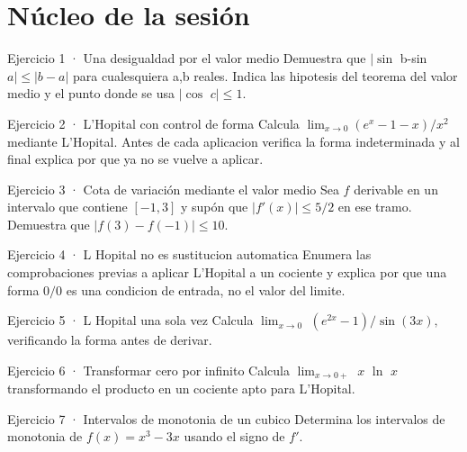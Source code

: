 \documentclass[10pt,a4paper,oneside,openany]{book}
\begin{document}
\section*{Núcleo de la sesión}
\begin{PSevenExerciseFixed}{Ejercicio 1 · Una desigualdad por el valor medio}
Demuestra que \(|\sin\) b-sin \(a|\le |b-a|\) para cualesquiera a,b reales. Indica las hipotesis del teorema del valor medio y el punto donde se usa \(|\cos\) \(c|\le 1\).
\end{PSevenExerciseFixed}
\begin{PSevenExerciseFixed}{Ejercicio 2 · L'Hopital con control de forma}
Calcula \(\lim_{x\to 0}(e^x-1-x)/x^{2}\) mediante L'Hopital. Antes de cada aplicacion verifica la forma indeterminada y al final explica por que ya no se vuelve a aplicar.
\end{PSevenExerciseFixed}
\begin{PSevenExerciseFixed}{Ejercicio 3 · Cota de variación mediante el valor medio}
Sea \(f\) derivable en un intervalo que contiene \([-1,3]\) y supón que \(|f'(x)|\le5/2\) en ese tramo. Demuestra que \(|f(3)-f(-1)|\le10\).
\end{PSevenExerciseFixed}
\begin{PSevenExerciseFixed}{Ejercicio 4 · L Hopital no es sustitucion automatica}
Enumera las comprobaciones previas a aplicar L'Hopital a un cociente y explica por que una forma \(0/0\) es una condicion de entrada, no el valor del limite.
\end{PSevenExerciseFixed}
\begin{PSevenExerciseFixed}{Ejercicio 5 · L Hopital una sola vez}
Calcula \(\lim_{x\to 0}\) \((e^{2x}-1)/\sin(3x),\) verificando la forma antes de derivar.
\end{PSevenExerciseFixed}
\begin{PSevenExerciseFixed}{Ejercicio 6 · Transformar cero por infinito}
Calcula \(\lim_{x\to 0+}\) \(x\) \(\ln\) \(x\) transformando el producto en un cociente apto para L'Hopital.
\end{PSevenExerciseFixed}
\begin{PSevenExerciseFixed}{Ejercicio 7 · Intervalos de monotonia de un cubico}
Determina los intervalos de monotonia de \(f(x)=x^{3}-3x\) usando el signo de \(f'\).
\end{PSevenExerciseFixed}
\end{document}
